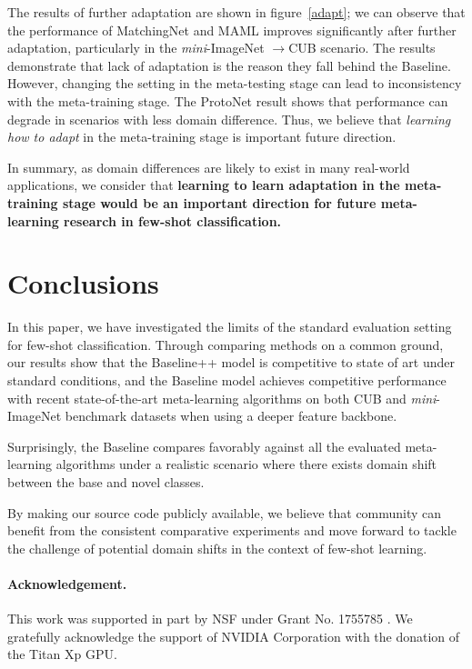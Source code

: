 The results of further adaptation are shown in figure~\ref{adapt}; we can observe that the performance of MatchingNet and MAML improves significantly after further adaptation, particularly in the \emph{mini}-ImageNet $\rightarrow$CUB scenario. The results demonstrate that lack of adaptation is the reason they fall behind the Baseline. However, changing the setting in the meta-testing stage can lead to inconsistency with the meta-training stage. The ProtoNet result shows that performance can degrade in scenarios with less domain difference. Thus, we believe that \emph{learning how to adapt} in the meta-training stage is important future direction.

In summary, as domain differences are likely to exist in many real-world applications, we consider that \textbf{learning to learn adaptation in the meta-training stage would be an important direction for future meta-learning research in few-shot classification.}

\section{Conclusions}
\label{sec:conclusions}  

In this paper, we have investigated the limits of the standard evaluation setting for few-shot classification. Through comparing methods on a common ground, our results show that the Baseline++ model is competitive to state of art under standard conditions, and the Baseline model achieves competitive performance with recent state-of-the-art meta-learning algorithms on both CUB and \emph{mini}-ImageNet  benchmark datasets when using a deeper feature backbone. 

Surprisingly, the Baseline compares favorably against all the evaluated meta-learning algorithms under a realistic scenario where there exists domain shift between the base and novel classes. 

By making our source code publicly available, we believe that community can benefit from the consistent comparative experiments and move forward to tackle the challenge of potential domain shifts in the context of few-shot learning. 

\paragraph{Acknowledgement.} 

 This work was supported in part by NSF under Grant No. 1755785 . We gratefully acknowledge the support of NVIDIA Corporation with the donation of the Titan Xp GPU.


